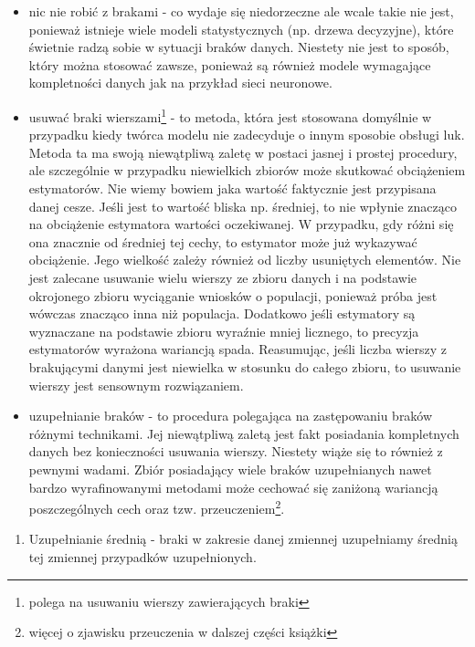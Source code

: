 \documentclass[]{book}
\providecommand{\tightlist}{%
  \setlength{\itemsep}{0pt}\setlength{\parskip}{0pt}}
\let\rmarkdownfootnote\footnote%
\def\footnote{\protect\rmarkdownfootnote}
\theoremstyle{plain}
\theoremstyle{definition}
\begin{document}
\begin{itemize}
\tightlist
\item
  nic nie robić z brakami - co wydaje się niedorzeczne ale wcale takie nie jest, ponieważ istnieje wiele modeli statystycznych (np. drzewa decyzyjne), które świetnie radzą sobie w sytuacji braków danych. Niestety nie jest to sposób, który można stosować zawsze, ponieważ są również modele wymagające kompletności danych jak na przykład sieci neuronowe.
\item
  usuwać braki wierszami\footnote{polega na usuwaniu wierszy zawierających braki} - to metoda, która jest stosowana domyślnie w przypadku kiedy twórca modelu nie zadecyduje o innym sposobie obsługi luk. Metoda ta ma swoją niewątpliwą zaletę w postaci jasnej i prostej procedury, ale szczególnie w przypadku niewielkich zbiorów może skutkować obciążeniem estymatorów. Nie wiemy bowiem jaka wartość faktycznie jest przypisana danej cesze. Jeśli jest to wartość bliska np. średniej, to nie wpłynie znacząco na obciążenie estymatora wartości oczekiwanej. W przypadku, gdy różni się ona znacznie od średniej tej cechy, to estymator może już wykazywać obciążenie. Jego wielkość zależy również od liczby usuniętych elementów. Nie jest zalecane usuwanie wielu wierszy ze zbioru danych i na podstawie okrojonego zbioru wyciąganie wniosków o populacji, ponieważ próba jest wówczas znacząco inna niż populacja. Dodatkowo jeśli estymatory są wyznaczane na podstawie zbioru wyraźnie mniej licznego, to precyzja estymatorów wyrażona wariancją spada. Reasumując, jeśli liczba wierszy z brakującymi danymi jest niewielka w stosunku do całego zbioru, to usuwanie wierszy jest sensownym rozwiązaniem.
\item
  uzupełnianie braków - to procedura polegająca na zastępowaniu braków różnymi technikami. Jej niewątpliwą zaletą jest fakt posiadania kompletnych danych bez konieczności usuwania wierszy. Niestety wiąże się to również z pewnymi wadami. Zbiór posiadający wiele braków uzupełnianych nawet bardzo wyrafinowanymi metodami może cechować się zaniżoną wariancją poszczególnych cech oraz tzw. przeuczeniem\footnote{więcej o zjawisku przeuczenia w dalszej części książki}.
\end{itemize}

\begin{enumerate}
\def\labelenumi{\arabic{enumi}.}
\tightlist
\item
  Uzupełnianie średnią - braki w zakresie danej zmiennej uzupełniamy średnią tej zmiennej przypadków uzupełnionych.
\end{enumerate}
\end{document}
